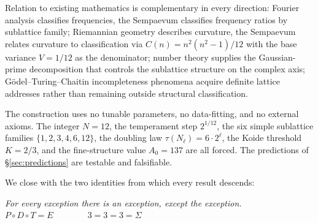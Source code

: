 \documentclass[11pt,a4paper]{article}
\theoremstyle{definition}
\theoremstyle{remark}
\begin{document}
Relation to existing mathematics is complementary in every direction: Fourier analysis classifies frequencies, the Sempaevum classifies frequency ratios by sublattice family; Riemannian geometry describes curvature, the Sempaevum relates curvature to classification via $C(n)=n^{2}(n^{2}-1)/12$ with the base variance $V=1/12$ as the denominator; number theory supplies the Gaussian-prime decomposition that controls the sublattice structure on the complex axis; G\"odel--Turing--Chaitin incompleteness phenomena acquire definite lattice addresses rather than remaining outside structural classification.

The construction uses no tunable parameters, no data-fitting, and no external axioms. The integer $N=12$, the temperament step $2^{1/12}$, the six simple sublattice families $\{1,2,3,4,6,12\}$, the doubling law $\tau(N_{\ell})=6\cdot 2^{\ell}$, the Koide threshold $K=2/3$, and the fine-structure value $A_{0}=137$ are all forced. The predictions of \S\ref{sec:predictions} are testable and falsifiable.

We close with the two identities from which every result descends:

\begin{center}
\emph{For every exception there is an exception, except the exception.}\\[4pt]
$P \circ D \circ T = E \qquad\qquad 3 = 3 = 3 = \Sigma$
\end{center}
\end{document}

